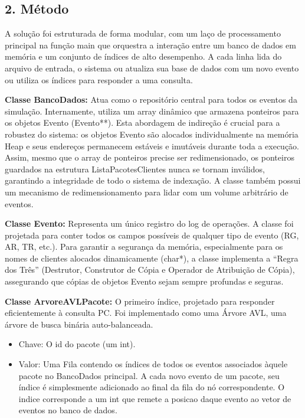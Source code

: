 \documentclass[
  12pt,
]{article}
\begin{document}
\subsection{2. Método}\label{muxe9todo}

A solução foi estruturada de forma modular, com um laço de processamento
principal na função main que orquestra a interação entre um banco de
dados em memória e um conjunto de índices de alto desempenho. A cada
linha lida do arquivo de entrada, o sistema ou atualiza sua base de
dados com um novo evento ou utiliza os índices para responder a uma
consulta.

\textbf{Classe BancoDados:} Atua como o repositório central para todos
os eventos da simulação. Internamente, utiliza um array dinâmico que
armazena ponteiros para os objetos Evento (Evento**). Esta abordagem de
indireção é crucial para a robustez do sistema: os objetos Evento são
alocados individualmente na memória Heap e seus endereços permanecem
estáveis e imutáveis durante toda a execução. Assim, mesmo que o array
de ponteiros precise ser redimensionado, os ponteiros guardados na
estrutura ListaPacotesClientes nunca se tornam inválidos, garantindo a
integridade de todo o sistema de indexação. A classe também possui um
mecanismo de redimensionamento para lidar com um volume arbitrário de
eventos.

\textbf{Classe Evento:} Representa um único registro do log de
operações. A classe foi projetada para conter todos os campos possíveis
de qualquer tipo de evento (RG, AR, TR, etc.). Para garantir a segurança
da memória, especialmente para os nomes de clientes alocados
dinamicamente (char*), a classe implementa a ``Regra dos Três''
(Destrutor, Construtor de Cópia e Operador de Atribuição de Cópia),
assegurando que cópias de objetos Evento sejam sempre profundas e
seguras.

\textbf{Classe ArvoreAVLPacote:} O primeiro índice, projetado para
responder eficientemente à consulta PC. Foi implementado como uma Árvore
AVL, uma árvore de busca binária auto-balanceada.

\begin{itemize}
\item
  Chave: O id do pacote (um int).
\item
  Valor: Uma Fila contendo os índices de todos os eventos associados
  àquele pacote no BancoDados principal. A cada novo evento de um
  pacote, seu índice é simplesmente adicionado ao final da fila do nó
  correspondente. O indice corresponde a um int que remete a posicao
  daque evento ao vetor de eventos no banco de dados.
\end{itemize}
\end{document}
